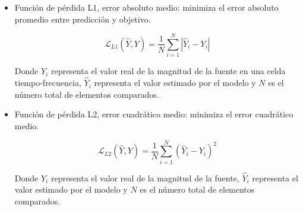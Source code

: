 
\begin{itemize}
    \item Función de pérdida L1, error absoluto medio: minimiza el error absoluto promedio entre predicción y objetivo.
\begin{center}
    \[
\mathcal{L}_{L1}(\hat{Y}, Y) =
\frac{1}{N}
\sum_{i=1}^{N}
\left| \hat{Y}_i - Y_i \right|
\]
\end{center}

Donde \(Y_i\) representa el valor real de la magnitud de la fuente en una celda tiempo-frecuencia, \(\hat{Y}_i\) representa el valor estimado por el modelo y \(N\) es el número total de elementos comparados.

    \item Función de pérdida L2, error cuadrático medio: minimiza el error cuadrático medio.
\begin{center}
    \[
\mathcal{L}_{L2}(\hat{Y}, Y) =
\frac{1}{N}
\sum_{i=1}^{N}
\left( \hat{Y}_i - Y_i \right)^2
\]
\end{center}

Donde \(Y_i\) representa el valor real de la magnitud de la fuente, \(\hat{Y}_i\) representa el valor estimado por el modelo y \(N\) es el número total de elementos comparados.


\end{itemize}